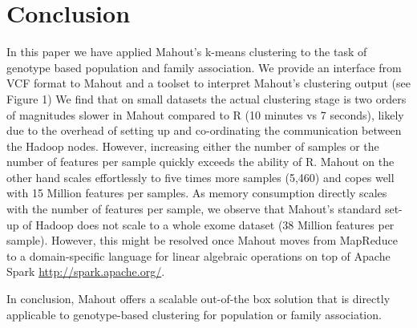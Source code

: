 \documentclass{bioinfo}
\begin{document}
\section*{Conclusion}
In this paper we have applied Mahout's k-means clustering to the task of genotype based population and family association. 
We provide an interface from VCF format to Mahout and a toolset to interpret Mahout's clustering output (see Figure 1)
We find that on small datasets the actual clustering stage is two orders of magnitudes slower in Mahout compared to R (10 minutes vs 7 seconds), likely due to the overhead of setting up and co-ordinating the communication between the Hadoop nodes. 
However, increasing either the number of samples or the number of features per sample quickly exceeds the ability of R.
Mahout on the other hand scales effortlessly to five times more samples (5,460) and copes well with 15 Million features per samples.
As memory consumption directly scales with the number of features per sample, we observe that Mahout's standard set-up of Hadoop does not scale to a whole exome dataset (38 Million features per sample).
However, this might be resolved once Mahout moves from MapReduce to a domain-specific language for linear algebraic operations on top of Apache Spark \url{http://spark.apache.org/}.

In conclusion, Mahout offers a scalable out-of-the box solution that is directly applicable to genotype-based clustering for population or family association. 

\end{document}
